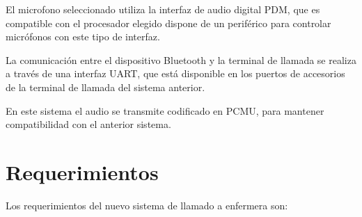 El microfono seleccionado utiliza la interfaz de audio digital PDM, que es compatible con el procesador elegido dispone de un periférico para controlar micrófonos con este tipo de interfaz.

La comunicación entre el dispositivo Bluetooth y la terminal de llamada se realiza a  través de una interfaz UART, que está disponible en los puertos de accesorios de la terminal de llamada del sistema anterior.

En este sistema el audio se transmite codificado en PCMU, para mantener compatibilidad con el anterior sistema.


\section{Requerimientos}

Los requerimientos del nuevo sistema de llamado a enfermera son:

